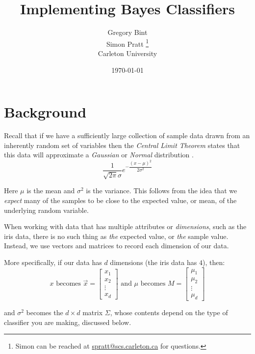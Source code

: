 \documentclass{article}
\title{Implementing Bayes Classifiers}
\author{Gregory Bint \\
  Simon Pratt
  \footnote{Simon can be reached at
    \href{mailto:spratt@scs.carleton.ca}{spratt@scs.carleton.ca} for questions.} \\
  {\small Carleton University}}
\date{\today}
\begin{document}
\maketitle


\section{Background}
\label{sec:Background}

Recall that if we have a sufficiently large collection of sample data
drawn from an inherently random set of variables then the
\emph{Central Limit Theorem} \cite{wiki_clt} states that this data
will approximate a \emph{Gaussian} or \emph{Normal} distribution
\cite{wiki_normal_dist}.
\begin{equation}
\label{e_sv_gauss}
\dfrac{1}{\sqrt{2\pi}\sigma}e^{-\dfrac{(x-\mu)^2}{2\sigma^2}}
\end{equation}

Here $\mu$ is the mean and $\sigma^2$ is the variance. This follows
from the idea that we \emph{expect} many of the samples to be close to
the expected value, or mean, of the underlying random variable.

When working with data that has multiple attributes or
\emph{dimensions}, such as the iris data, there is no such thing as
\emph{the} expected value, or \emph{the} sample value. Instead, we use
vectors and matrices to record each dimension of our data.

More specifically, if our data has $d$ dimensions (the iris data has
$4$), then:
\[ 
x \text{ becomes } \vec{x} = 
\begin{bmatrix} x_1 \\ x_2 \\ \vdots \\ x_d \end{bmatrix}
\text { and } 
\mu \text{ becomes } M = 
\begin{bmatrix} \mu_1 \\ \mu_2 \\ \vdots \\ \mu_d \end{bmatrix}
\]

and $\sigma^2$ becomes the $d \times d$ matrix $\Sigma$, whose
contents depend on the type of classifier you are making, discussed
below.
\end{document}
